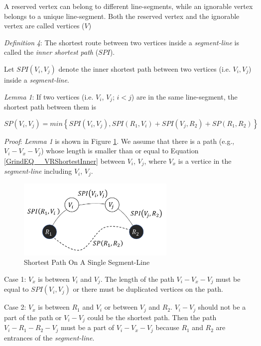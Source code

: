 A reserved vertex can belong to different line-segments, while an ignorable vertex belongs to a unique line-segment. Both the reserved vertex and the ignorable vertex are called vertices ($V$)\textit{}

\textit{Definition} \textit{4}: The shortest route between two vertices inside a \textit{segment-line} is called the \textit{inner shortest path} ($SPI$). 

Let ${SPI}\left(V_i,V_j\right)$ denote the inner shortest path between two vertices (i.e. $V_i,V_j$) inside a \textit{segment-line}.

\textit{Lemma} \textit{1}: If two vertices (i.e. $V_i$, $V_j$; $i<j$) are in the same line-segment, the shortest path between them is

\begin{equation} \label{GrindEQ__VRShortestInner} 
{SP}\left(V_i,V_j\right)={min}\left\{SPI\left(V_i,V_j\right),SPI\left(R_1,V_i\right)+SPI\left(V_j,R_2\right)+SP\left(R_1,R_2\right)\right\}
\end{equation}

\textit{Proof}: \textit{Lemma} \textit{1} is shown in Figure \ref{fig:ShortestPathOnASingleSegment}. We assume that there is a path (e.g., $V_i-V_x-V_j$) whose length is smaller than or equal to Equation \ref{GrindEQ__VRShortestInner} between $V_i$, $V_j$, where $V_x$ is a vertice in the \textit{segment-line} including $V_i$, $V_j$.

\begin{figure} [hbtp]
  \centering 
  \includegraphics[height=1.5in]{figures/ShortestPathOnASingleSegment.png}
  \caption{Shortest Path On A Single Segment-Line} 
  \label{fig:ShortestPathOnASingleSegment} %
\end{figure}

Case 1: $V_x$ is between $V_i$ and $V_j$. The length of the path $V_i-V_x-V_j$ must be equal to $SPI\left(V_i,V_j\right)$ or there must be duplicated vertices on the path.

Case 2: $V_x$ is between $R_1$ and $V_i$ or between $V_j$ and $R_2$. $V_i-V_j$ should not be a part of the path or $V_i-V_j$ could be the shortest path. Then the path $V_i-R_1-R_2-V_j$ must be a part of $V_i-V_x-V_j$ because $R_1$ and $R_2$ are entrances of the \textit{segment-line}.

